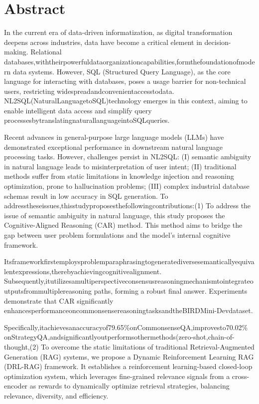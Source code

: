 \documentclass[12pt,a4paper,openright,UTF8]{ctexbook}
\begin{document}
\chapter*{Abstract}

In the current era of data-driven informatization, as digital transformation deepens across industries, data have become a critical element in decision-making. Relational databases,withtheirpowerfuldataorganizationcapabilities,formthefoundationofmodern data systems. However, SQL (Structured Query Language), as the core language for interacting with databases, poses a usage barrier for non-technical users, restricting widespreadandconvenientaccesstodata. NL2SQL(NaturalLanguagetoSQL)technology emerges in this context, aiming to enable intelligent data access and simplify query processesbytranslatingnaturallanguageintoSQLqueries.


Recent advances in general-purpose large language models (LLMs) have demonstrated exceptional performance in downstream natural language processing tasks. However, challenges persist in NL2SQL: (I) semantic ambiguity in natural language leads to misinterpretation of user intent; (II) traditional methods suffer from static limitations in knowledge injection and reasoning optimization, prone to hallucination problems; (III) complex industrial database schemas result in low accuracy in SQL generation. To addresstheseissues,thisstudyproposesthefollowingcontributions:(1) To address the issue of semantic ambiguity in natural language, this study proposes the Cognitive-Aligned Reasoning (CAR) method. This method aims to bridge the gap between user problem formulations and the model’s internal cognitive framework.


Itsframeworkfirstemploysproblemparaphrasingtogeneratediversesemanticallyequivalentexpressions,therebyachievingcognitivealignment. Subsequently,itutilizesamultiperspectiveconsensusreasoningmechanismtointegrateoutputsfrommultiplereasoning paths, forming a robust final answer. Experiments demonstrate that CAR significantly enhancesperformanceoncommonsensereasoningtasksandtheBIRDMini-Devdataset.


Specifically,itachievesanaccuracyof79.65\%onCommonsenseQA,improvesto70.02\% onStrategyQA,andsignificantlyoutperformsothermethods(zero-shot,chain-of-thought,(2) To overcome the static limitations of traditional Retrieval-Augmented Generation (RAG) systems, we propose a Dynamic Reinforcement Learning RAG (DRL-RAG) framework. It establishes a reinforcement learning-based closed-loop optimization system, which leverages fine-grained relevance signals from a cross-encoder as rewards to dynamically optimize retrieval strategies, balancing relevance, diversity, and efficiency.
\end{document}
